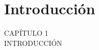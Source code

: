 
{
\Hide
\chapter{Introducción}
}

\begin{titular} 
	\uppercase{
	capítulo 1 \\
	introducción \\
	}
\end{titular}

